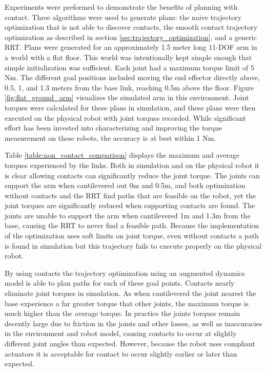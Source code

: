 \documentclass[../thesis.tex]{subfiles}
\begin{document}
Experiments were preformed to demonstrate the benefits of planning with contact.
Three algorithms were used to generate plans: the naive trajectory optimization that is not able to discover contacts, the smooth contact trajectory optimization as described in section \ref{sec:trajectory_optimization},  and a generic RRT. 
Plans were generated for an approximately 1.5 meter long 11-DOF arm in a world with a flat floor.
This world was intentionally kept simple enough that simple initialization was sufficient.
Each joint had a maximum torque limit of 5 Nm.
The different goal positions included moving the end effector directly above, 0.5, 1, and 1.3 meters from the base link, reaching 0.5m above the floor.
Figure \ref{fig:flat_ground_arm} visualizes the simulated arm in this environment.
Joint torques were calculated for these plans in simulation, and these plans were then executed on the physical robot with joint torques recorded.
While significant effort has been invested into characterizing and improving the torque measurement on these robots, the accuracy is at best within 1 Nm.


Table \ref{table:non_contact_comparison} displays the maximum and average torques experienced by the links.
Both in simulation and on the physical robot it is clear allowing contacts can significantly reduce the joint torque.
The joints can support the arm when cantilevered out 0m and 0.5m, and both optimization without contacts and the RRT find paths that are feasible on the robot, yet the joint torques are significantly reduced when supporting contacts are found.
The joints are unable to support the arm when cantilevered 1m and 1.3m from the base, causing the RRT to never find a feasible path.
Because the implementation of the optimization uses soft limits on joint torque, even without contacts a path is found in simulation but this trajectory fails to execute properly on the physical robot.

By using contacts the trajectory optimization using an augmented dynamics model is able to plan paths for each of these goal points.
Contacts nearly eliminate joint torques in simulation.
As when cantilevered the joint nearest the base experience a far greater torque that other joints, the maximum torque is much higher than the average torque.
In practice the joints torques remain decently large due to friction in the joints and other losses, as well as inaccuracies in the environment and robot model, causing contacts to occur at slightly different joint angles than expected.
However, because the robot uses compliant actuators it is acceptable for contact to occur slightly earlier or later than expected.
\end{document}
